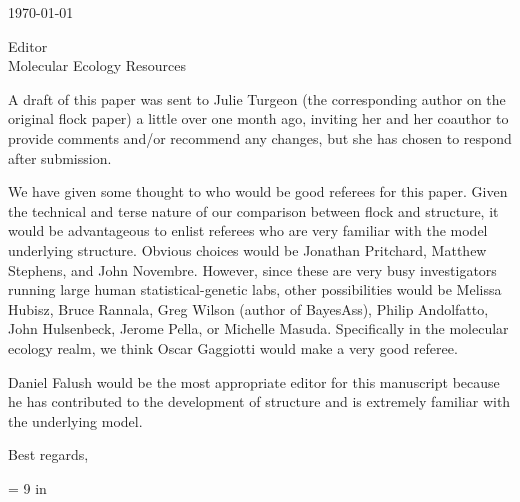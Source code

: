 \documentclass[11pt]{letter}
\begin{document}
\begin{letter}{ \today 

Editor \\
Molecular Ecology Resources\\
}
A draft of this paper was sent to Julie Turgeon (the corresponding author on the original {\sc flock} paper) a little over one month ago, inviting her and her coauthor to provide comments and/or recommend any changes, but she has chosen to respond after submission.

We have given some thought to who would be good referees for this paper.  Given the technical and terse nature of our comparison between {\sc flock} and {\sc structure}, it would be advantageous to enlist referees who are very familiar with the model underlying {\sc structure}.  Obvious choices would be Jonathan Pritchard, Matthew Stephens, and John Novembre.  However, since these are very busy investigators running large human statistical-genetic labs, other possibilities would be Melissa Hubisz, Bruce Rannala, Greg Wilson (author of BayesAss), Philip Andolfatto, John Hulsenbeck, Jerome Pella, or Michelle Masuda.  Specifically in the molecular ecology realm, we think Oscar Gaggiotti would make a very good referee.

Daniel Falush would be the most appropriate editor for this manuscript because he has contributed to the development of {\sc structure} and is extremely familiar with the underlying model.  


\closing{Best regards,}
\setlength{\topmargin}{0in}
\textheight = 9 in
\end{letter}

 
\end{document}
